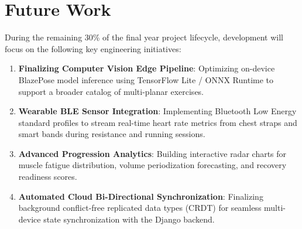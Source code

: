 \documentclass[12pt,a4paper]{report}
\begin{document}
\section{Future Work}
During the remaining 30\% of the final year project lifecycle, development will focus on the following key engineering initiatives:
\begin{enumerate}
    \item \textbf{Finalizing Computer Vision Edge Pipeline}: Optimizing on-device BlazePose model inference using TensorFlow Lite / ONNX Runtime to support a broader catalog of multi-planar exercises.
    \item \textbf{Wearable BLE Sensor Integration}: Implementing Bluetooth Low Energy standard profiles to stream real-time heart rate metrics from chest straps and smart bands during resistance and running sessions.
    \item \textbf{Advanced Progression Analytics}: Building interactive radar charts for muscle fatigue distribution, volume periodization forecasting, and recovery readiness scores.
    \item \textbf{Automated Cloud Bi-Directional Synchronization}: Finalizing background conflict-free replicated data types (CRDT) for seamless multi-device state synchronization with the Django backend.
\end{enumerate}
\end{document}
